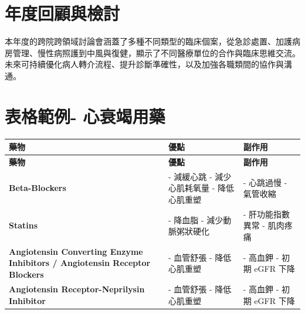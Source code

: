 \documentclass[nols]{tufte-book}
\begin{document}
\section{年度回顧與檢討}
本年度的跨院跨領域討論會涵蓋了多種不同類型的臨床個案，從急診處置、加護病房管理、慢性病照護到中風與復健，顯示了不同醫療單位的合作與臨床思維交流。未來可持續優化病人轉介流程、提升診斷準確性，以及加強各職類間的協作與溝通。

\section{表格範例- 心衰竭用藥}

\renewcommand{\arraystretch}{1.3} %

\begin{longtable}{p{4cm}p{6cm}p{6cm}}
    \hline
    \textbf{藥物} & \textbf{優點} & \textbf{副作用} \\
    \hline
    \endfirsthead

    \hline
    \textbf{藥物} & \textbf{優點} & \textbf{副作用} \\
    \hline
    \endhead

    \hline
    \endfoot

    \hline
    \endlastfoot

    \textbf{Beta-Blockers} & 
    - 減緩心跳 \newline
    - 減少心肌耗氧量 \newline
    - 降低心肌重塑 &
    - 心跳過慢 \newline
    - 氣管收縮 \\
    \hline

    \textbf{Statins} & 
    - 降血脂 \newline
    - 減少動脈粥狀硬化 &
    - 肝功能指數異常 \newline
    - 肌肉疼痛 \\
    \hline

    \textbf{Angiotensin Converting Enzyme Inhibitors / Angiotensin Receptor Blockers} & 
    - 血管舒張 \newline
    - 降低心肌重塑 &
    - 高血鉀 \newline
    - 初期 eGFR 下降 \\
    \hline

    \textbf{Angiotensin Receptor-Neprilysin Inhibitor} & 
    - 血管舒張 \newline
    - 降低心肌重塑 &
    - 高血鉀 \newline
    - 初期 eGFR 下降 \\
    \hline


\end{longtable}
\end{document}
